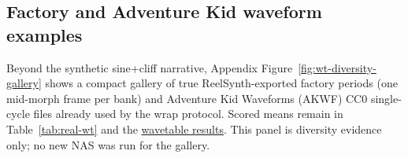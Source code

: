 \subsection{Factory and Adventure Kid waveform examples}
\label{sec:wt-gallery}

Beyond the synthetic sine{+}cliff narrative, Appendix Figure~\ref{fig:wt-diversity-gallery} shows a compact gallery of true ReelSynth-exported factory periods (one mid-morph frame per bank) and Adventure Kid Waveforms (AKWF) CC0 single-cycle files already used by the wrap protocol.
Scored means remain in Table~\ref{tab:real-wt} and the \href{https://github.com/reeldemo/denoise-opt}{wavetable results}.
This panel is diversity evidence only; no new NAS was run for the gallery.
